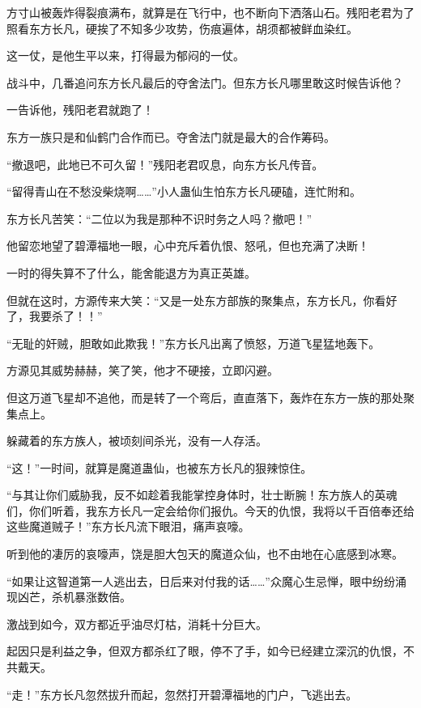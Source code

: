 \begin{this_body}
方寸山被轰炸得裂痕满布，就算是在飞行中，也不断向下洒落山石。残阳老君为了照看东方长凡，硬挨了不知多少攻势，伤痕遍体，胡须都被鲜血染红。

这一仗，是他生平以来，打得最为郁闷的一仗。

战斗中，几番追问东方长凡最后的夺舍法门。但东方长凡哪里敢这时候告诉他？

一告诉他，残阳老君就跑了！

东方一族只是和仙鹤门合作而已。夺舍法门就是最大的合作筹码。

“撤退吧，此地已不可久留！”残阳老君叹息，向东方长凡传音。

“留得青山在不愁没柴烧啊……”小人蛊仙生怕东方长凡硬磕，连忙附和。

东方长凡苦笑：“二位以为我是那种不识时务之人吗？撤吧！”

他留恋地望了碧潭福地一眼，心中充斥着仇恨、怒吼，但也充满了决断！

一时的得失算不了什么，能舍能退方为真正英雄。

但就在这时，方源传来大笑：“又是一处东方部族的聚集点，东方长凡，你看好了，我要杀了！！”

“无耻的奸贼，胆敢如此欺我！”东方长凡出离了愤怒，万道飞星猛地轰下。

方源见其威势赫赫，笑了笑，他才不硬接，立即闪避。

但这万道飞星却不追他，而是转了一个弯后，直直落下，轰炸在东方一族的那处聚集点上。

躲藏着的东方族人，被顷刻间杀光，没有一人存活。

“这！”一时间，就算是魔道蛊仙，也被东方长凡的狠辣惊住。

“与其让你们威胁我，反不如趁着我能掌控身体时，壮士断腕！东方族人的英魂们，你们听着，我东方长凡一定会给你们报仇。今天的仇恨，我将以千百倍奉还给这些魔道贼子！”东方长凡流下眼泪，痛声哀嚎。

听到他的凄厉的哀嚎声，饶是胆大包天的魔道众仙，也不由地在心底感到冰寒。

“如果让这智道第一人逃出去，日后来对付我的话……”众魔心生忌惮，眼中纷纷涌现凶芒，杀机暴涨数倍。

激战到如今，双方都近乎油尽灯枯，消耗十分巨大。

起因只是利益之争，但双方都杀红了眼，停不了手，如今已经建立深沉的仇恨，不共戴天。

“走！”东方长凡忽然拔升而起，忽然打开碧潭福地的门户，飞逃出去。

\end{this_body}

